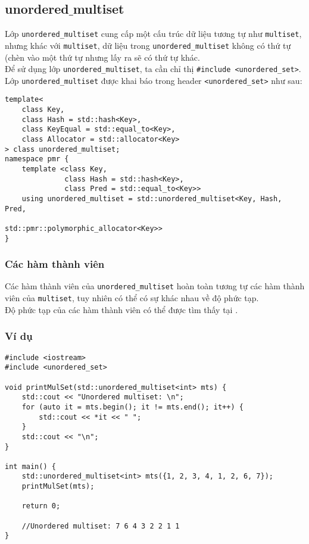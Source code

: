 \subsection{unordered$\_$multiset}
Lớp \lstinline{unordered_multiset} cung cấp một cấu trúc dữ liệu tương tự như \lstinline{multiset}, nhưng khác với \lstinline{multiset}, dữ liệu trong \lstinline{unordered_multiset} không có thứ tự (chèn vào một thứ tự nhưng lấy ra sẽ có thứ tự khác.\\
Để sử dụng lớp \lstinline{unordered_multiset}, ta cần chỉ thị \lstinline{#include <unordered_set>}.\\
Lớp \lstinline{unordered_multiset} được khai báo trong header \lstinline{<unordered_set>} như sau: \cite{unmultiset}
\begin{lstlisting}
template<
    class Key,
    class Hash = std::hash<Key>,
    class KeyEqual = std::equal_to<Key>,
    class Allocator = std::allocator<Key>
> class unordered_multiset;
namespace pmr {
    template <class Key,
              class Hash = std::hash<Key>,
              class Pred = std::equal_to<Key>>
    using unordered_multiset = std::unordered_multiset<Key, Hash, Pred,
                                   std::pmr::polymorphic_allocator<Key>>
}
\end{lstlisting}
\subsubsection{Các hàm thành viên}
Các hàm thành viên của \lstinline{unordered_multiset} hoàn toàn tương tự các hàm thành viên của \lstinline{multiset}, tuy nhiên có thể có sự khác nhau về độ phức tạp.\\
Độ phức tạp của các hàm thành viên có thể được tìm thấy tại \cite{unormultiset}.
\subsubsection{Ví dụ}
\begin{lstlisting}
#include <iostream>
#include <unordered_set>

void printMulSet(std::unordered_multiset<int> mts) {
    std::cout << "Unordered multiset: \n";
    for (auto it = mts.begin(); it != mts.end(); it++) {
        std::cout << *it << " ";
    }
    std::cout << "\n";
}

int main() {
    std::unordered_multiset<int> mts({1, 2, 3, 4, 1, 2, 6, 7});
    printMulSet(mts);
    
    return 0;
    
    //Unordered multiset: 7 6 4 3 2 2 1 1
}
\end{lstlisting}
